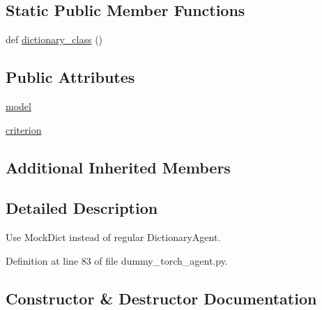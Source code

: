 \subsection*{Static Public Member Functions}
\begin{DoxyCompactItemize}
\item 
def \hyperlink{classparlai_1_1agents_1_1test__agents_1_1dummy__torch__agent_1_1MockTorchAgent_a122bde825e09b1450578a7ab7d606bfd}{dictionary\+\_\+class} ()
\end{DoxyCompactItemize}
\subsection*{Public Attributes}
\begin{DoxyCompactItemize}
\item 
\hyperlink{classparlai_1_1agents_1_1test__agents_1_1dummy__torch__agent_1_1MockTorchAgent_afebdb752bdbb212a078b4bdee5d9f45f}{model}
\item 
\hyperlink{classparlai_1_1agents_1_1test__agents_1_1dummy__torch__agent_1_1MockTorchAgent_a229d18c3a8eb8512c29feca34fed43b7}{criterion}
\end{DoxyCompactItemize}
\subsection*{Additional Inherited Members}


\subsection{Detailed Description}
\begin{DoxyVerb}Use MockDict instead of regular DictionaryAgent.
\end{DoxyVerb}
 

Definition at line 83 of file dummy\+\_\+torch\+\_\+agent.\+py.



\subsection{Constructor \& Destructor Documentation}
\mbox{\label{classparlai_1_1agents_1_1test__agents_1_1dummy__torch__agent_1_1MockTorchAgent_af14024f59e4ea3dea5c7ff38caff89ad}} 
